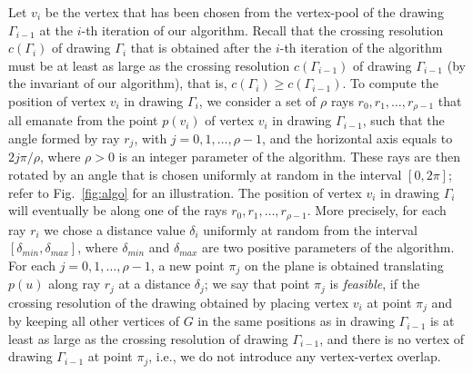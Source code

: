 \documentclass[runningheads]{llncs}
\begin{document}
Let $v_i$ be the vertex that has been chosen from the vertex-pool of the drawing $\Gamma_{i-1}$ at the $i$-th iteration of our algorithm. Recall that the crossing resolution $c(\Gamma_{i})$ of drawing $\Gamma_{i}$ that is obtained after the $i$-th iteration of the algorithm must be at least as large as the crossing resolution $c(\Gamma_{i-1})$ of drawing $\Gamma_{i-1}$ (by the invariant of our algorithm), that is, $c(\Gamma_i) \ge c(\Gamma_{i-1})$. To compute the position of vertex $v_i$ in drawing $\Gamma_i$, we consider a set of $\rho$ rays $r_0,r_1,\ldots,r_{\rho-1}$ that all emanate from the point $p(v_i)$ of vertex $v_i$ in drawing $\Gamma_{i-1}$, such that the angle formed by ray $r_j$, with $j=0,1,\ldots,\rho-1$, and the horizontal axis equals to $2j\pi/\rho$, where $\rho>0$ is an integer parameter of the algorithm. These rays are then rotated by an angle that is chosen uniformly at random in the interval $[0,2\pi]$; refer to Fig.~\ref{fig:algo} for an illustration. The position of vertex $v_i$ in drawing $\Gamma_i$ will eventually be along one of the rays $r_0,r_1,\ldots,r_{\rho-1}$. More precisely, for each ray $r_i$ we chose a distance value $\delta_i$ uniformly at random from the interval $[\delta_{min},\delta_{max}]$, where $\delta_{min}$ and $\delta_{max}$ are two positive parameters of the algorithm. For each $j=0,1,\ldots,\rho-1$, a new point $\pi_j$ on the plane is obtained translating $p(u)$ along ray $r_j$ at a distance $\delta_j$; we say that point $\pi_j$ is \emph{feasible}, if the crossing resolution of the drawing obtained by placing vertex $v_i$ at point $\pi_j$ and by keeping all other vertices of $G$ in the same positions as in drawing $\Gamma_{i-1}$ is at least as large as the crossing resolution of drawing $\Gamma_{i-1}$, and there is no vertex of drawing $\Gamma_{i-1}$ at point $\pi_j$, i.e., we do not introduce any vertex-vertex overlap. 
\end{document}

